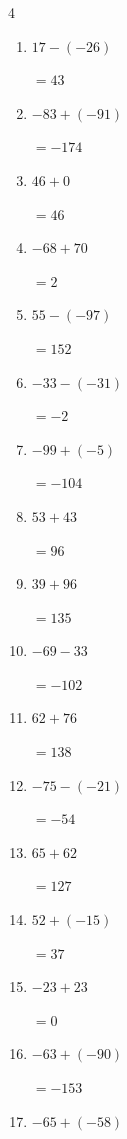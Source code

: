\begin{multicols}{4}
\begin{enumerate}
  \item $17-(-26)$

        $=43$

  \item $-83+(-91)$

        $=-174$

  \item $46+0$

        $=46$

  \item $-68+70$

        $=2$

\columnbreak %

  \item $55-(-97)$

        $=152$

  \item $-33-(-31)$

        $=-2$

  \item $-99+(-5)$

        $=-104$

  \item $53+43$

        $=96$

  \item $39+96$

        $=135$

  \item $-69-33$

        $=-102$

  \item $62+76$

        $=138$

  \item $-75-(-21)$

        $=-54$

  \item $65+62$

        $=127$

  \item $52+(-15)$

        $=37$

  \item $-23+23$

        $=0$

  \item $-63+(-90)$

        $=-153$

  \item $-65+(-58)$


\end{enumerate}
\end{multicols}
